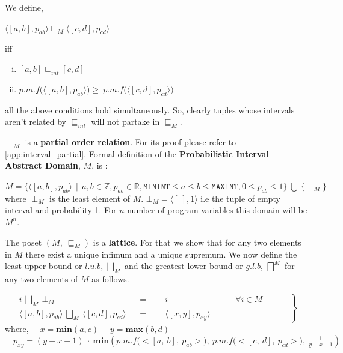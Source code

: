 \documentclass[final,3p, review, times]{Elsevier/elsarticle}
\begin{document}
We define,

\centerline{$\langle[a,b],p_{ab}\rangle\sqsubseteq_M\langle[c,d],p_{cd}\rangle$}
iff
\begin{enumerate}[i)]
\item $[a,b]\sqsubseteq_{int}[c,d]$
\item $p.m.f\Big(\langle[a,b],p_{ab}\rangle\Big)\geq\ p.m.f\Big(\langle[c,d],p_{cd}\rangle\Big)$
\end{enumerate}
all the above conditions hold simultaneously. So, clearly tuples whose intervals aren't related by $\sqsubseteq_{int}$ will not partake in $\sqsubseteq_M$.

$\sqsubseteq_M$ is a \textbf{partial order relation}. For its proof please refer to \ref{app:interval_partial}. Formal definition of the \textbf{Probabilistic Interval Abstract Domain}, $M$, is :

$M=\big\{\langle[a,b],p_{ab}\rangle\ \ |\ \ a,b\in\mathbb{Z}, p_{ab}\in\mathbb{R}, \mathtt{MININT}\leq a\leq b\leq\mathtt{MAXINT}, 0\leq p_{ab}\leq1\big\}\ \bigcup\ \big\{\perp_M\big\}$\\
where $\perp_M$ is the least element of $M$. $\bot_M=\langle[\ ],1\rangle$ i.e the tuple of empty interval and probability 1. For $n$ number of program variables this domain will be $M^n$.

The poset $(M,\ \sqsubseteq_M)$ is a \textbf{lattice}. For that we show that for any two elements in $M$ there exist a unique infimum and a unique supremum. We now define the least upper bound or $l.u.b$, $\displaystyle\bigsqcup_M$ and the greatest lower bound or $g.l.b$, $\displaystyle\bigsqcap^M$ for any two elements of $M$ as follows.

\begin{equation}
\label{eq:lub_M}
 \left.\begin{aligned}
        i\ \bigsqcup_M\ \bot_M&&=&\quad\ \ i\qquad\qquad\qquad\qquad\text{$\forall i\in M$}\\
        \langle[a,b],p_{ab}\rangle\ \bigsqcup_M\ \langle[c,d],p_{cd}\rangle&&=&\quad\ \ \langle[x,y],p_{xy}\rangle\qquad\quad\qquad\qquad
       \end{aligned}\qquad
 \right\}
\end{equation}
where,
	$\quad x=\mathbf{min}(a,c)$
	$\quad y=\mathbf{max}(b,d)$
	$\quad\displaystyle p_{xy}=(y-x+1)\ \cdot\ \mathbf{min}\left(p.m.f\Big(\big<[a,\ b],\ p_{ab}\big>\Big),\ p.m.f\Big(\big<[c,\ d],\ p_{cd}\big>\Big),\ \frac{1}{y-x+1}\right)$
	
\end{document}
